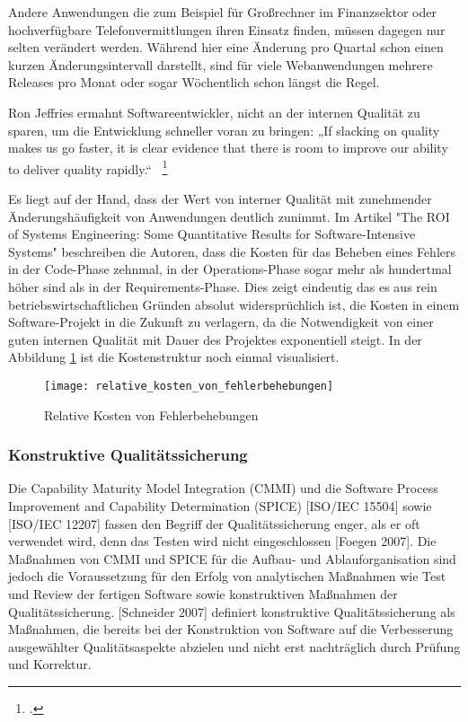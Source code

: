 Andere Anwendungen die zum Beispiel für Großrechner im Finanzsektor oder hochverfügbare Telefonvermittlungen ihren Einsatz finden, müssen dagegen nur selten verändert werden. Während hier eine Änderung pro Quartal schon einen kurzen Änderungsintervall darstellt, sind für viele Webanwendungen mehrere Releases pro Monat oder sogar Wöchentlich schon längst die Regel.

Ron Jeffries ermahnt Softwareentwickler, nicht an der internen Qualität zu sparen, um die Entwicklung schneller voran zu bringen:
„If slacking on quality makes us go faster, it is clear evidence that there is room to improve our ability to deliver quality rapidly.“ ~\footcite[Vgl.]{website:jeffries.2010}

Es liegt auf der Hand, dass der Wert von interner Qualität mit zunehmender Änderungshäufigkeit von Anwendungen deutlich zunimmt. Im Artikel "The ROI of Systems Engineering: Some Quantitative Results for
Software-Intensive Systems" beschreiben die Autoren, dass die Kosten für das Beheben eines Fehlers in der Code-Phase zehnmal, in der Operations-Phase sogar mehr als hundertmal höher sind als in der Requirements-Phase. 
Dies zeigt eindeutig das es aus rein betriebswirtschaftlichen Gründen absolut widersprüchlich ist, die Kosten in einem Software-Projekt in die Zukunft zu verlagern, da die Notwendigkeit von einer guten internen Qualität 
mit Dauer des Projektes exponentiell steigt. In der Abbildung \ref{relative_kosten_von_fehlerbehebungen} ist die Kostenstruktur noch einmal visualisiert.

\begin{figure}[H]
	\begin{center}
		\texttt{[image: relative\_kosten\_von\_fehlerbehebungen]}
		\caption{Relative Kosten von Fehlerbehebungen}
		\label{relative_kosten_von_fehlerbehebungen}
	\end{center}
\end{figure}


\subsubsection{Konstruktive Qualitätssicherung} %
Die Capability Maturity Model Integration (CMMI) und die Software Process Improvement and Capability Determination (SPICE) [ISO/IEC 15504] sowie [ISO/IEC 12207] fassen den Begriff der Qualitätssicherung enger, als er oft verwendet wird, denn das Testen wird nicht eingeschlossen [Foegen 2007]. Die Maßnahmen von CMMI und SPICE für die Aufbau- und Ablauforganisation sind jedoch die Voraussetzung für den Erfolg von analytischen Maßnahmen wie Test und Review der fertigen Software sowie konstruktiven Maßnahmen der Qualitätssicherung. [Schneider 2007] definiert konstruktive
Qualitätssicherung als Maßnahmen, die bereits bei der Konstruktion von Software auf die
Verbesserung ausgewählter Qualitätsaspekte abzielen und nicht erst nachträglich durch
Prüfung und Korrektur.

